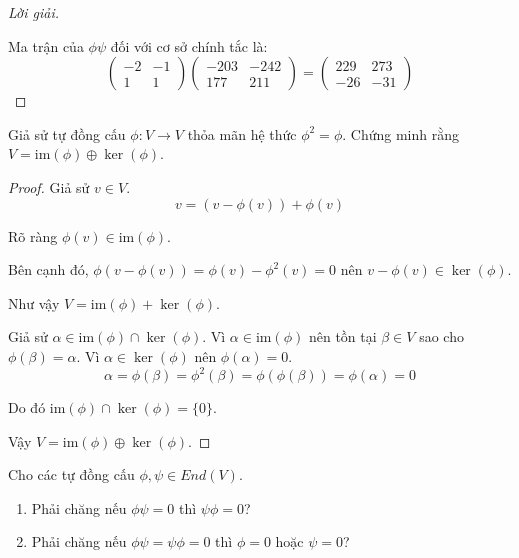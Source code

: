 \documentclass[class=linearalgebra,crop=false]{standalone}
\begin{document}
\begin{proof}[Lời giải]
\[    \]
    \par Ma trận của $\phi\psi$ đối với cơ sở chính tắc là:
    \[
        \begin{pmatrix}
            -2 & -1 \\
            1  & 1
        \end{pmatrix}
        \begin{pmatrix}
            -203 & -242 \\
            177  & 211
        \end{pmatrix}=
        \begin{pmatrix}
            229 & 273 \\
            -26 & -31
        \end{pmatrix}
    \]
\end{proof}

\begin{exercise}
    Giả sử tự đồng cấu $\phi: V\to V$ thỏa mãn hệ thức $\phi^{2} = \phi$. Chứng minh rằng $V = \text{im}(\phi)\oplus\ker(\phi)$.
\end{exercise}

\begin{proof}
    Giả sử $v\in V$.
    \[
        v = (v - \phi(v)) + \phi(v)
    \]
    \par Rõ ràng $\phi(v)\in\text{im}(\phi)$.
    \par Bên cạnh đó, $\phi(v - \phi(v)) = \phi(v) - \phi^{2}(v) = 0$ nên $v - \phi(v)\in\ker(\phi)$.
    \par Như vậy $V = \text{im}(\phi)+\ker(\phi)$.
    \bigskip
    \par Giả sử $\alpha\in\text{im}(\phi)\cap\ker(\phi)$. Vì $\alpha\in\text{im}(\phi)$ nên tồn tại $\beta\in V$ sao cho $\phi(\beta) = \alpha$. Vì $\alpha\in\ker(\phi)$ nên $\phi(\alpha) = 0$.
    \[
        \alpha = \phi(\beta) = \phi^{2}(\beta) = \phi(\phi(\beta)) = \phi(\alpha) = 0
    \]
    \par Do đó $\text{im}(\phi)\cap\ker(\phi) = \{ 0 \}$.
    \par Vậy $V = \text{im}(\phi)\oplus\ker(\phi)$.
\end{proof}

\begin{exercise}
    Cho các tự đồng cấu $\phi, \psi\in End(V)$.
    \begin{enumerate}[label = (\alph*)]
        \item Phải chăng nếu $\phi\psi = 0$ thì $\psi\phi = 0$?
        \item Phải chăng nếu $\phi\psi = \psi\phi = 0$ thì $\phi = 0$ hoặc $\psi = 0$?
    \end{enumerate}
\end{exercise}
\end{document}

